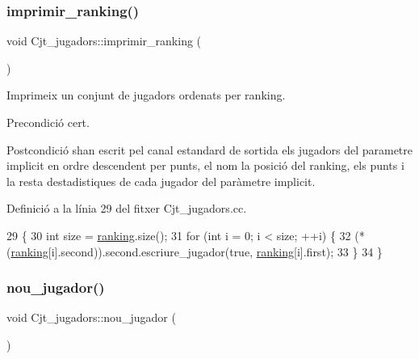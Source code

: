 \subsubsection{\texorpdfstring{imprimir\+\_\+ranking()}{imprimir\_ranking()}}
{\footnotesize\ttfamily void Cjt\+\_\+jugadors\+::imprimir\+\_\+ranking (\begin{DoxyParamCaption}{ }\end{DoxyParamCaption})}



Imprimeix un conjunt de jugadors ordenats per ranking. 

\begin{DoxyPrecond}{Precondició}
cert. 
\end{DoxyPrecond}
\begin{DoxyPostcond}{Postcondició}
s\textquotesingle{}han escrit pel canal estandard de sortida els jugadors del parametre implicit en ordre descendent per punts, el nom la posició del ranking, els punts i la resta d\textquotesingle{}estadistiques de cada jugador del paràmetre implicit. 
\end{DoxyPostcond}


Definició a la línia 29 del fitxer Cjt\+\_\+jugadors.\+cc.


\begin{DoxyCode}
29                                     \{
30     \textcolor{keywordtype}{int} size = \mbox{\hyperlink{class_cjt__jugadors_af9f7e71820fb657bf489ce72a31e8034}{ranking}}.size();
31     \textcolor{keywordflow}{for} (\textcolor{keywordtype}{int} i = 0; i < size; ++i) \{
32         (*(\mbox{\hyperlink{class_cjt__jugadors_af9f7e71820fb657bf489ce72a31e8034}{ranking}}[i].second)).second.escriure\_jugador(\textcolor{keyword}{true}, \mbox{\hyperlink{class_cjt__jugadors_af9f7e71820fb657bf489ce72a31e8034}{ranking}}[i].first);
33     \}
34 \}
\end{DoxyCode}
\mbox{\label{class_cjt__jugadors_abc12f64a28c23ba5bd1e94814476de6e}} 
\subsubsection{\texorpdfstring{nou\+\_\+jugador()}{nou\_jugador()}}
{\footnotesize\ttfamily void Cjt\+\_\+jugadors\+::nou\+\_\+jugador (\begin{DoxyParamCaption}{ }\end{DoxyParamCaption})}



